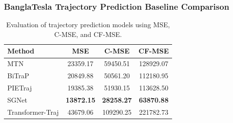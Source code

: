 \documentclass[
	11pt, %
]{beamer}
\begin{document}
\begin{frame}
    \frametitle{BanglaTesla Trajectory Prediction Baseline Comparison}
    \begin{table}[h]
        \centering
        \begin{tabular}{l|c|c|c}
            \toprule
            \textbf{Method} & \textbf{MSE} & \textbf{C-MSE} & \textbf{CF-MSE} \\
            \midrule
            MTN               & 23359.17 & 59450.51 & 128929.07 \\
            BiTraP            & 20849.88 & 50561.20 & 112180.95 \\
            PIETraj           & 19385.38 & 51930.15 & 113628.50 \\
            SGNet             & \textbf{13872.15} & \textbf{28258.27} & \textbf{63870.88} \\
            Transformer-Traj  & 43679.06 & 109290.25 & 221782.73 \\
            \bottomrule
        \end{tabular}
    \caption{Evaluation of trajectory prediction models using MSE, C-MSE, and CF-MSE.}
    \end{table}
\end{frame}
\end{document}
